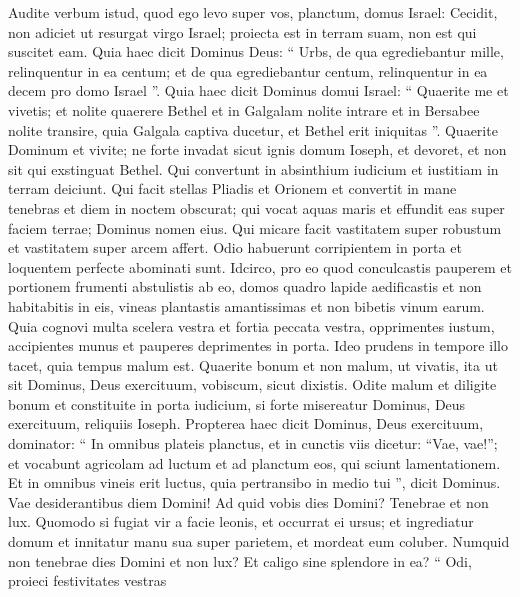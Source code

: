 \begin{biblechapter}
\begin{biblechapter}
\begin{biblechapter}
\begin{biblechapter}
\begin{biblechapter}
 \verse Audite verbum istud,
 quod ego levo super vos,
 planctum, domus Israel:
 \verse Cecidit, non adiciet ut resurgat
 virgo Israel;
 proiecta est in terram suam,
 non est qui suscitet eam.
 \verse Quia haec dicit Dominus Deus:
 “ Urbs, de qua egrediebantur mille,
 relinquentur in ea centum;
 et de qua egrediebantur centum,
 relinquentur in ea decem
 pro domo Israel ”.
 \verse Quia haec dicit Dominus domui Israel:
 “ Quaerite me et vivetis;
 \verse et nolite quaerere Bethel
 et in Galgalam nolite intrare
 et in Bersabee nolite transire,
 quia Galgala captiva ducetur,
 et Bethel erit iniquitas ”.
 \verse Quaerite Dominum et vivite;
 ne forte invadat sicut ignis
 domum Ioseph,
 et devoret, et non sit
 qui exstinguat Bethel.
 \verse Qui convertunt in absinthium iudicium
 et iustitiam in terram deiciunt.
 \verse Qui facit stellas Pliadis et Orionem
 et convertit in mane tenebras
 et diem in noctem obscurat;
 qui vocat aquas maris
 et effundit eas super faciem terrae;
 Dominus nomen eius.
 \verse Qui micare facit vastitatem super robustum
 et vastitatem super arcem affert.
 \verse Odio habuerunt corripientem in porta
 et loquentem perfecte abominati sunt.
 \verse Idcirco, pro eo quod conculcastis pauperem
 et portionem frumenti abstulistis ab eo,
 domos quadro lapide aedificastis
 et non habitabitis in eis,
 vineas plantastis amantissimas
 et non bibetis vinum earum.
 \verse Quia cognovi multa scelera vestra
 et fortia peccata vestra,
 opprimentes iustum, accipientes munus
 et pauperes deprimentes in porta.
 \verse Ideo prudens in tempore illo tacet,
 quia tempus malum est.
 \verse Quaerite bonum et non malum,
 ut vivatis,
 ita ut sit Dominus, Deus exercituum,
 vobiscum, sicut dixistis.
 \verse Odite malum et diligite bonum
 et constituite in porta iudicium,
 si forte misereatur Dominus, Deus exercituum,
 reliquiis Ioseph.
 \verse Propterea haec dicit Dominus,
 Deus exercituum, dominator:
 “ In omnibus plateis planctus,
 et in cunctis viis dicetur: “Vae, vae!”;
 et vocabunt agricolam ad luctum
 et ad planctum eos, qui sciunt lamentationem.
 \verse Et in omnibus vineis erit luctus,
 quia pertransibo in medio tui ”,
 dicit Dominus.
 \verse Vae desiderantibus diem Domini!
 Ad quid vobis dies Domini?
 Tenebrae et non lux.
 \verse Quomodo si fugiat vir a facie leonis,
 et occurrat ei ursus;
 et ingrediatur domum
 et innitatur manu sua super parietem,
 et mordeat eum coluber.
 \verse Numquid non tenebrae dies Domini et non lux?
 Et caligo sine splendore in ea?
 \verse “ Odi, proieci festivitates vestras

\end{biblechapter}
\end{biblechapter}
\end{biblechapter}
\end{biblechapter}
\end{biblechapter}
